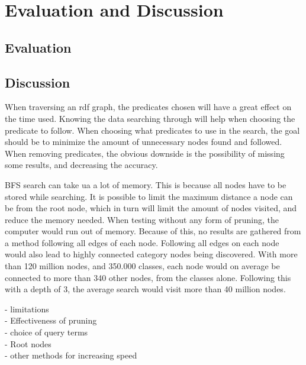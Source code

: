 \chapter{Evaluation and Discussion}
\label{cha:Discussion}

\section{Evaluation}
\label{sec:Evaluation}


\section{Discussion}
\label{sec:Discussion}
When traversing an rdf graph, the predicates chosen will have a great effect on the time used. Knowing the data searching through will help when choosing the predicate to follow. When choosing what predicates to use in the search, the goal should be to minimize the amount of unnecessary nodes found and followed. When removing predicates, the obvious downside is the possibility of missing some results, and decreasing the accuracy.

BFS search can take ua a lot of memory. This is because all nodes have to be stored while searching. It is possible to limit the maximum distance a node can be from the root node, which in turn will limit the amount of nodes visited, and reduce the memory needed. When testing without any form of pruning, the computer would run out of memory. Because of this, no results are gathered from a method following all edges of each node. Following all edges on each node would also lead to highly connected category nodes being discovered. With more than 120 million nodes, and 350.000 classes, each node would on average be connected to more than 340 other nodes, from the classes alone. Following this with a depth of 3, the average search would visit more than 40 million nodes.

- limitations\\
- Effectiveness of pruning\\
- choice of query terms\\
- Root nodes\\
- other methods for increasing speed\\
